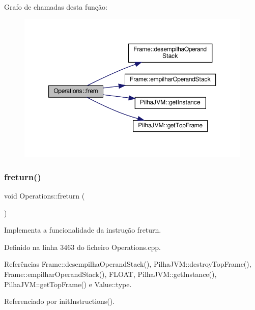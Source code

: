 Grafo de chamadas desta função\+:
\nopagebreak
\begin{figure}[H]
\begin{center}
\leavevmode
\includegraphics[width=350pt]{classOperations_ad29eac4f222e4b74667086c3da0d5538_cgraph}
\end{center}
\end{figure}
\mbox{\label{classOperations_a701431fe6d5d20fafa747dbeae90e1d4}} 
\subsubsection{\texorpdfstring{freturn()}{freturn()}}
{\footnotesize\ttfamily void Operations\+::freturn (\begin{DoxyParamCaption}{ }\end{DoxyParamCaption})\hspace{0.3cm}{\ttfamily [private]}}



Implementa a funcionalidade da instrução freturn. 



Definido na linha 3463 do ficheiro Operations.\+cpp.



Referências Frame\+::desempilha\+Operand\+Stack(), Pilha\+J\+V\+M\+::destroy\+Top\+Frame(), Frame\+::empilhar\+Operand\+Stack(), F\+L\+O\+AT, Pilha\+J\+V\+M\+::get\+Instance(), Pilha\+J\+V\+M\+::get\+Top\+Frame() e Value\+::type.



Referenciado por init\+Instructions().

